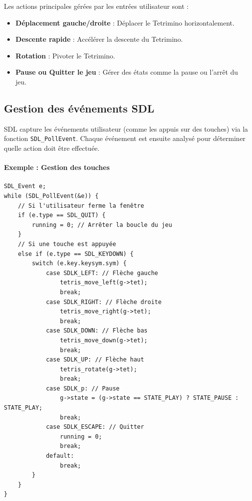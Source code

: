 \documentclass[12pt,a4paper]{report}
\begin{document}
Les actions principales gérées par les entrées utilisateur sont :
\begin{itemize}
    \item \textbf{Déplacement gauche/droite} : Déplacer le Tetrimino horizontalement.
    \item \textbf{Descente rapide} : Accélérer la descente du Tetrimino.
    \item \textbf{Rotation} : Pivoter le Tetrimino.
    \item \textbf{Pause ou Quitter le jeu} : Gérer des états comme la pause ou l’arrêt du jeu.
\end{itemize}

\subsection{Gestion des événements SDL}
SDL capture les événements utilisateur (comme les appuis sur des touches) via la fonction \texttt{SDL\_PollEvent}. Chaque événement est ensuite analysé pour déterminer quelle action doit être effectuée.

\paragraph{Exemple : Gestion des touches}
\begin{lstlisting}
SDL_Event e;
while (SDL_PollEvent(&e)) {
    // Si l'utilisateur ferme la fenêtre
    if (e.type == SDL_QUIT) {
        running = 0; // Arrêter la boucle du jeu
    }
    // Si une touche est appuyée
    else if (e.type == SDL_KEYDOWN) {
        switch (e.key.keysym.sym) {
            case SDLK_LEFT: // Flèche gauche
                tetris_move_left(g->tet);
                break;
            case SDLK_RIGHT: // Flèche droite
                tetris_move_right(g->tet);
                break;
            case SDLK_DOWN: // Flèche bas
                tetris_move_down(g->tet);
                break;
            case SDLK_UP: // Flèche haut
                tetris_rotate(g->tet);
                break;
            case SDLK_p: // Pause
                g->state = (g->state == STATE_PLAY) ? STATE_PAUSE : STATE_PLAY;
                break;
            case SDLK_ESCAPE: // Quitter
                running = 0;
                break;
            default:
                break;
        }
    }
}
\end{lstlisting}
\end{document}
